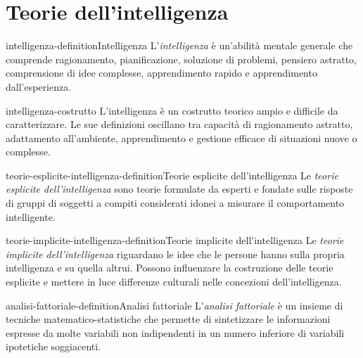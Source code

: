 \documentclass[preview]{standalone}
\begin{document}
\genpage

\section{Teorie dell'intelligenza}

\begin{snippetdefinition}{intelligenza-definition}{Intelligenza}
    L'\emph{intelligenza} è un'abilità mentale generale che comprende
    ragionamento, pianificazione, soluzione di problemi, pensiero astratto,
    comprensione di idee complesse, apprendimento rapido e apprendimento
    dall'esperienza.
\end{snippetdefinition}

\begin{snippet}{intelligenza-costrutto}
    L'intelligenza è un costrutto teorico ampio e difficile da caratterizzare.
    Le sue definizioni oscillano tra capacità di ragionamento astratto,
    adattamento all'ambiente, apprendimento e gestione efficace di situazioni
    nuove o complesse.
\end{snippet}

\begin{snippetdefinition}{teorie-esplicite-intelligenza-definition}{Teorie esplicite dell'intelligenza}
    Le \emph{teorie esplicite dell'intelligenza} sono teorie formulate da
    esperti e fondate sulle risposte di gruppi di soggetti a compiti considerati
    idonei a misurare il comportamento intelligente.
\end{snippetdefinition}

\begin{snippetdefinition}{teorie-implicite-intelligenza-definition}{Teorie implicite dell'intelligenza}
    Le \emph{teorie implicite dell'intelligenza} riguardano le idee che le
    persone hanno sulla propria intelligenza e su quella altrui. Possono
    influenzare la costruzione delle teorie esplicite e mettere in luce
    differenze culturali nelle concezioni dell'intelligenza.
\end{snippetdefinition}

\begin{snippetdefinition}{analisi-fattoriale-definition}{Analisi fattoriale}
    L'\emph{analisi fattoriale} è un insieme di tecniche
    matematico-statistiche che permette di sintetizzare le informazioni espresse
    da molte variabili non indipendenti in un numero inferiore di variabili
    ipotetiche soggiacenti.
\end{snippetdefinition}
\end{document}
